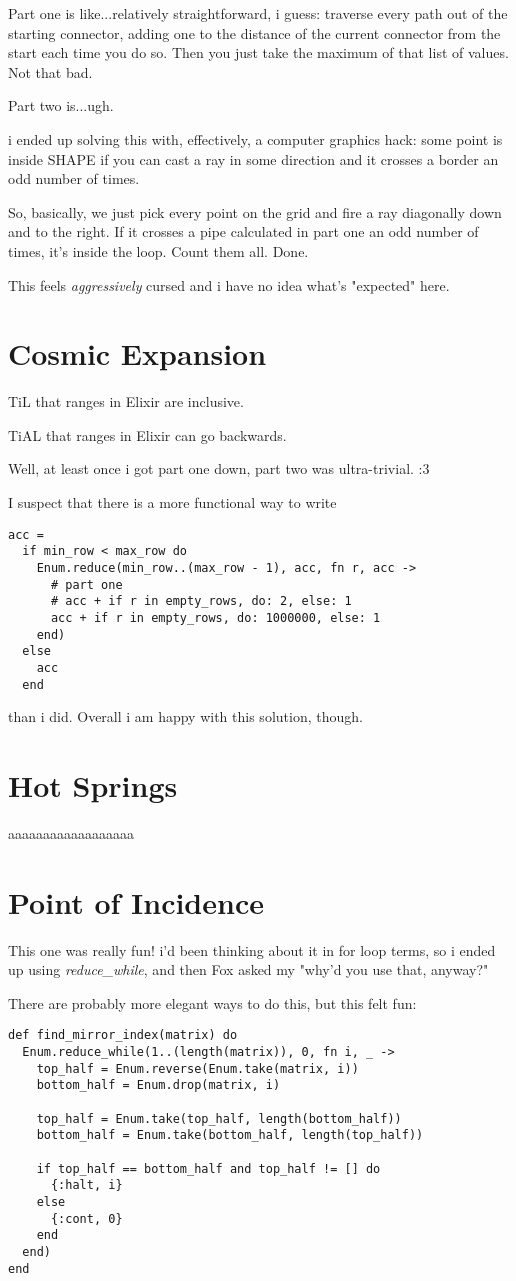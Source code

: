 \documentclass{article}
\begin{document}
Part one is like...relatively straightforward, i guess: traverse every path out of the starting connector, adding one to the distance of the current connector from the start each time you do so. Then you just take the maximum of that list of values. Not that bad.

Part two is...ugh.

i ended up solving this with, effectively, a computer graphics hack: some point is inside SHAPE if you can cast a ray in some direction and it crosses a border an odd number of times.

So, basically, we just pick every point on the grid and fire a ray diagonally down and to the right. If it crosses a pipe calculated in part one an odd number of times, it's inside the loop. Count them all. Done.

This feels \textit{aggressively} cursed and i have no idea what's "expected" here.

\section{Cosmic Expansion}
TiL that ranges in Elixir are inclusive.

TiAL that ranges in Elixir can go backwards.

Well, at least once i got part one down, part two was ultra-trivial. :3

I suspect that there is a more functional way to write
\begin{verbatim}
acc =
  if min_row < max_row do
    Enum.reduce(min_row..(max_row - 1), acc, fn r, acc ->
      # part one
      # acc + if r in empty_rows, do: 2, else: 1
      acc + if r in empty_rows, do: 1000000, else: 1
    end)
  else
    acc
  end
\end{verbatim}
than i did. Overall i am happy with this solution, though.

\section{Hot Springs}
aaaaaaaaaaaaaaaaaa

\section{Point of Incidence}
This one was really fun! i'd been thinking about it in for loop terms, so i ended up using \textit{reduce_while}, and then Fox asked my "why'd you use that, anyway?"

There are probably more elegant ways to do this, but this felt fun:
\begin{verbatim}
def find_mirror_index(matrix) do
  Enum.reduce_while(1..(length(matrix)), 0, fn i, _ ->
    top_half = Enum.reverse(Enum.take(matrix, i))
    bottom_half = Enum.drop(matrix, i)

    top_half = Enum.take(top_half, length(bottom_half))
    bottom_half = Enum.take(bottom_half, length(top_half))

    if top_half == bottom_half and top_half != [] do
      {:halt, i}
    else
      {:cont, 0}
    end
  end)
end
\end{verbatim}
\end{document}
